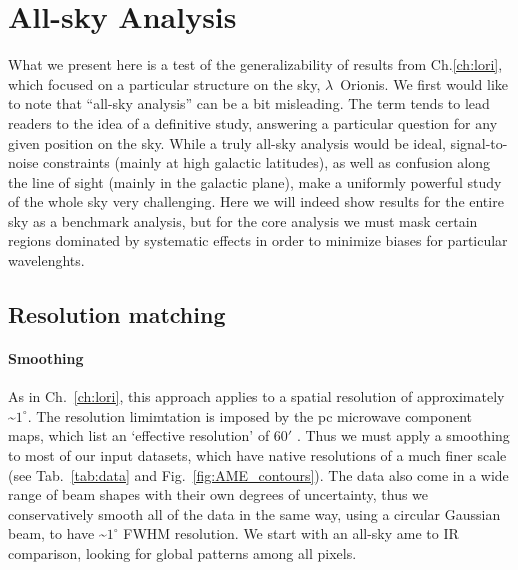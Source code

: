 \chapter{All-sky Analysis}
  \label{ch:allsky}
    What we present here is a test of the generalizability of results from Ch.\ref{ch:lori}, which focused on a particular structure on the sky, $\lambda$~Orionis.
    We first would like to note that ``all-sky analysis'' can be a bit misleading. The term tends to lead readers to the idea of a definitive study, answering a particular question for any given position on the sky.  While a truly all-sky analysis would be ideal, signal-to-noise constraints (mainly at high galactic latitudes), as well as confusion along the line of sight (mainly in the galactic plane), make a uniformly powerful study of the whole sky very challenging. Here we will indeed show results for the entire sky as a benchmark analysis, but for the core analysis we must mask certain regions dominated by systematic effects in order to minimize biases for particular wavelenghts.

\section{Resolution matching}
    \subsubsection{Smoothing}
        As in Ch.~\ref{ch:lori}, this approach applies to a spatial resolution of approximately \textasciitilde{}$1^{\circ}$. The resolution limimtation is imposed by the \acrshort{pc} microwave component maps, which list an `effective resolution' of 60$'$ \citep{planck15X}. Thus we must apply a smoothing to most of our input datasets, which have native resolutions of a much finer scale (see Tab.~\ref{tab:data} and Fig.~\ref{fig:AME_contours}). The data also come in a wide range of beam shapes with their own degrees of uncertainty, thus we conservatively smooth all of the data in the same way, using a circular Gaussian beam, to have \textasciitilde{}$1^{\circ}$ FWHM resolution. We start with an all-sky \acrshort{ame} to IR comparison, looking for global patterns among all pixels.

